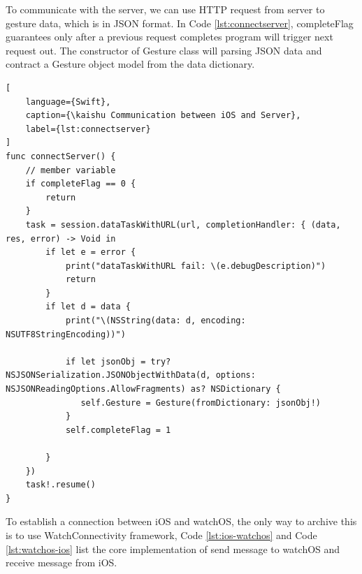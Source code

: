 To communicate with the server, we can use HTTP request from server to gesture data, which is in JSON format. In Code \ref{lst:connectserver}, completeFlag guarantees only after a previous request completes program will trigger next request out. The constructor of Gesture class will parsing JSON data and contract a Gesture object model from the data dictionary.

\begin{lstlisting}[
    language={Swift},
    caption={\kaishu Communication between iOS and Server},
    label={lst:connectserver}
]
func connectServer() {
    // member variable
    if completeFlag == 0 {
        return
    }
    task = session.dataTaskWithURL(url, completionHandler: { (data, res, error) -> Void in
        if let e = error {
            print("dataTaskWithURL fail: \(e.debugDescription)")
            return
        }
        if let d = data {
            print("\(NSString(data: d, encoding: NSUTF8StringEncoding))")

            if let jsonObj = try? NSJSONSerialization.JSONObjectWithData(d, options: NSJSONReadingOptions.AllowFragments) as? NSDictionary {
               self.Gesture = Gesture(fromDictionary: jsonObj!)
            }
            self.completeFlag = 1

        }
    })
    task!.resume()
}
\end{lstlisting}

To establish a connection between iOS and watchOS, the only way to archive this is to use WatchConnectivity framework, Code \ref{lst:ios-watchos} and Code \ref{lst:watchos-ios} list the core implementation of send message to watchOS and receive message from iOS.

